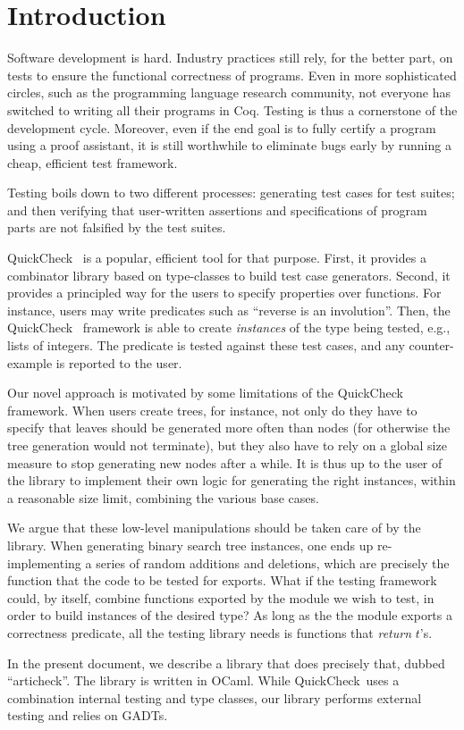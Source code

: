 \section{Introduction}

\newcommand\qcheck{QuickCheck~}

Software development is hard. Industry practices still rely, for the better
part, on tests to ensure the functional correctness of programs. Even in more
sophisticated circles, such as the programming language research community, not
everyone has switched to writing all their programs in Coq. Testing is thus a
cornerstone of the development cycle. Moreover, even if the end goal is to fully
certify a program using a proof assistant, it is still worthwhile to eliminate
bugs early by running a cheap, efficient test framework.


Testing boils down to two different processes: generating test cases
for test suites; and then verifying that user-written assertions and
specifications of program parts are not falsified by the test suites.

\qcheck{} is a popular, efficient tool for that purpose. First, it
provides a combinator library based on type-classes to build test case
generators. Second, it provides a principled way for the users to
specify properties over functions. For instance, users may write
predicates such as ``reverse is an involution''. Then, the \qcheck
framework is able to create \emph{instances} of the type being tested,
e.g., lists of integers.  The predicate is tested against these test
cases, and any counter-example is reported to the user.

Our novel approach is motivated by some limitations of the \qcheck
framework.  When users create trees, for instance, not only do they
have to specify that leaves should be generated more often than nodes
(for otherwise the tree generation would not terminate), but they also
have to rely on a global size measure to stop generating new nodes
after a while. It is thus up to the user of the library to implement
their own logic for generating the right instances, within a
reasonable size limit, combining the various base cases.

We argue that these low-level manipulations should be taken care of by the
library. When generating binary search tree instances, one ends up
re-implementing a series of random additions and deletions, which are precisely
the function that the code to be tested for exports. What if the testing
framework could, by itself, combine functions exported by the module we wish to
test, in order to build instances of the desired type? As long as the the module
exports a correctness predicate, all the testing library needs is functions
that \emph{return} $t$'s.

In the present document, we describe a library that does precisely that, dubbed
``articheck''. The library is written in OCaml. While \qcheck uses a
combination internal testing and type classes, our library performs external
testing and relies on GADTs.